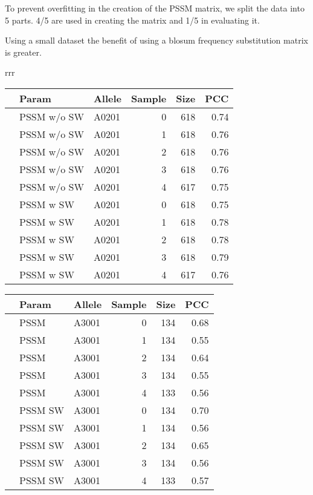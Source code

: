 To prevent overfitting in the creation of the PSSM matrix, we split the data into 5 parts. 4/5 are used in creating the matrix and 1/5 in evaluating it.

Using a small dataset the benefit of using a blosum frequency substitution matrix is greater.
\begin{table*}\scriptsize

\begin{center}

\begin{tabular}{rrr}

\begin{tabular}{rllrrr}
  \hline
 & Param & Allele & Sample & Size & PCC \\ 
  \hline
 & PSSM w/o SW & A0201 &   0 & 618 & 0.74 \\ 
 & PSSM w/o SW & A0201 &   1 & 618 & 0.76 \\ 
 & PSSM w/o SW & A0201 &   2 & 618 & 0.76 \\ 
 & PSSM w/o SW & A0201 &   3 & 618 & 0.76 \\ 
 & PSSM w/o SW & A0201 &   4 & 617 & 0.75 \\ 
\hline
 & PSSM w SW & A0201 &   0 & 618 & 0.75 \\ 
 & PSSM w SW & A0201 &   1 & 618 & 0.78 \\ 
 & PSSM w SW & A0201 &   2 & 618 & 0.78 \\ 
 & PSSM w SW & A0201 &   3 & 618 & 0.79 \\ 
 & PSSM w SW & A0201 &   4 & 617 & 0.76 \\ 
   \hline
\end{tabular}

\begin{tabular}{rllrrr}
  \hline
 & Param & Allele & Sample & Size & PCC \\ 
  \hline
   & PSSM & A3001 &   0 & 134 & 0.68 \\ 
   & PSSM & A3001 &   1 & 134 & 0.55 \\ 
   & PSSM & A3001 &   2 & 134 & 0.64 \\ 
   & PSSM & A3001 &   3 & 134 & 0.55 \\ 
   & PSSM & A3001 &   4 & 133 & 0.56 \\ 
  \hline
   & PSSM SW & A3001 &   0 & 134 & 0.70 \\ 
   & PSSM SW & A3001 &   1 & 134 & 0.56 \\ 
   & PSSM SW & A3001 &   2 & 134 & 0.65 \\ 
   & PSSM SW & A3001 &   3 & 134 & 0.56 \\ 
   & PSSM SW & A3001 &   4 & 133 & 0.57 \\ 
   \hline
\end{tabular}


\end{tabular}
\end{center}
\end{table*}

